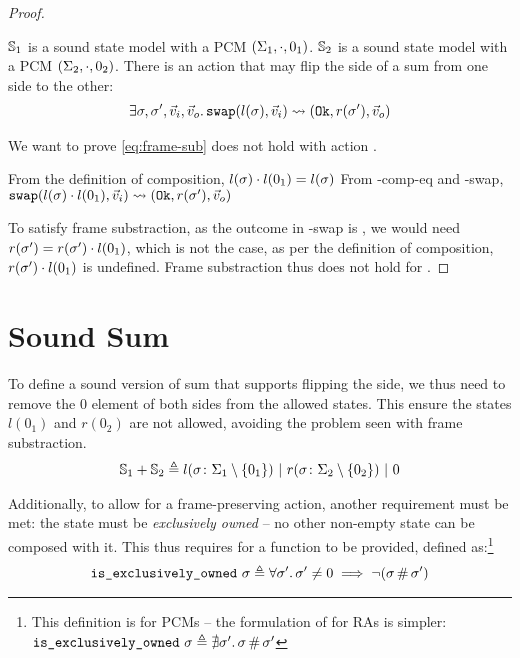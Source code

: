 \begin{proof}


\pfassume \begin{hypvlist}
 $\mathbb S_1$ is a sound state model with a PCM $(\Sigma_1, \cdot, 0_1)$.
 $\mathbb S_2$ is a sound state model with a PCM $(\Sigma_2, \cdot, 0_2)$.
 There is an action \swap{} that may flip the side of a sum from one side to the other: \begin{align*}
		\exists \sigma,\sigma',\vec{v}_i,\vec{v}_o\ldotp \texttt{swap}(l(\sigma),\vec{v}_i)\rightsquigarrow(\texttt{Ok},r(\sigma'),\vec{v}_o)
	\end{align*}
\end{hypvlist}

We want to prove \ref{eq:frame-sub} does not hold with action \swap.

\begin{hypvlist}
	 From the definition of composition, $l(\sigma)\cdot l(0_1)=l(\sigma)$
	 From \hyp{comp-eq} and \hyp{swap}, $\texttt{swap}(l(\sigma)\cdot l(0_1),\vec{v}_i)\rightsquigarrow(\texttt{Ok}, r(\sigma'),\vec{v}_o)$
\end{hypvlist}

To satisfy frame substraction, as the outcome in \hyp{swap} is \Ok, we would need ${r(\sigma') = r(\sigma') \cdot l(0_1)}$, which is not the case, as per the definition of composition, $r(\sigma') \cdot l(0_1)$ is undefined. Frame substraction thus does not hold for \swap.
\end{proof}

\section{Sound Sum}

To define a sound version of sum that supports flipping the side, we thus need to remove the $0$ element of both sides from the allowed states. This ensure the states $l(0_1)$ and $r(0_2)$ are not allowed, avoiding the problem seen with frame substraction. \begin{align*}
	\mathbb S_1 + \mathbb S_2 \triangleq l(\sigma\colon \Sigma_1\setminus \{0_1\}) ~|~ r(\sigma\colon \Sigma_2\setminus\{0_2\}) ~|~ 0
\end{align*}


Additionally, to allow for a frame-preserving \swap{} action, another requirement must be met: the state must be \textit{exclusively owned} -- no other non-empty state can be composed with it. This thus requires for a \isexowned{} function to be provided, defined as:\footnote{This definition is for PCMs -- the formulation of \isexowned{} for RAs is simpler: $\texttt{is\_exclusively\_owned}~\sigma \triangleq \nexists \sigma'\ldotp \sigma\operatorname{\#}\sigma'$}%
\begin{align*}
	\texttt{is\_exclusively\_owned}~\sigma \triangleq \forall\sigma'\ldotp \sigma'\neq0\implies\neg(\sigma\operatorname{\#}\sigma')
\end{align*}

